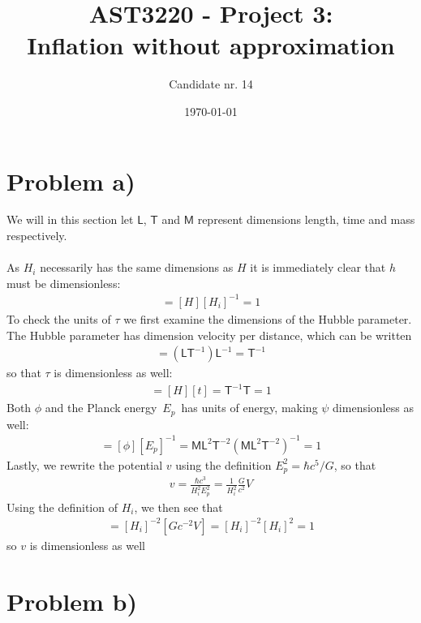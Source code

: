 \documentclass[reprint,english,notitlepage]{revtex4-1}  %
\numberwithin{equation}{section}
\newcommand{\TT}{\textsf{T}}
\newcommand{\LL}{\textsf{L}}
\newcommand{\MM}{\textsf{M}}
\begin{document}
\title{AST3220 - Project 3: \\ Inflation without approximation}   %
\author{Candidate nr. 14}
\date{\today}                             %
\noaffiliation                            %
\maketitle                                %

\section{Problem a)}
We will in this section let $\LL$, $\TT$ and $\MM$ represent dimensions length, time
and mass respectively.
\\
\\
As $H_i$ necessarily has the same dimensions as $H$ it is immediately
clear that $h$ must be dimensionless:
\begin{align}
	[h] = [H] [H_i]^{-1} = 1
\end{align}
To check the units of $\tau$ we first examine the dimensions of the Hubble
parameter. The Hubble parameter has dimension velocity per distance, which can
be written
\begin{align}
	[H] = (\LL \TT^{-1}) \LL^{-1} = \TT^{-1}
\end{align}
so that $\tau$ is dimensionless as well:
\begin{align}
  [\tau] = [H] [t] = \TT^{-1} \TT = 1
\end{align}
Both $\phi$ and the Planck energy $E_p$ has units of energy, making $\psi$ dimensionless
as well:
\begin{align}
	[\psi] = [\phi] [E_p]^{-1} = \MM \LL^2 \TT^{-2} (\MM \LL^2 \TT^{-2})^{-1} = 1
\end{align}
Lastly, we rewrite the potential $v$ using the definition $E_p^2 = \hbar c^5/G$,
so that
\begin{align}
	v = \frac{\hbar c^3}{H_i^2 E_p^2} = \frac{1}{H_i^2} \frac{G}{c^2}V
\end{align}
Using the definition of $H_i$, we then see that
\begin{align}
	[v] = [H_i]^{-2} [G c^{-2} V] = [H_i]^{-2}[H_i]^2 = 1
\end{align}
so $v$ is dimensionless as well

\section{Problem b)}
\end{document}
